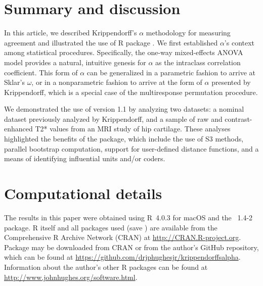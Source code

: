 \section{Summary and discussion}
\label{summary}

In this article, we described Krippendorff's $\alpha$ methodology for measuring agreement and illustrated the use of R package . We first established $\alpha$'s context among statistical procedures. Specifically, the one-way mixed-effects ANOVA model provides a natural, intuitive genesis for $\alpha$ as the intraclass correlation coefficient. This form of $\alpha$ can be generalized in a parametric fashion to arrive at Sklar's $\omega$, or in a nonparametric fashion to arrive at the form of $\alpha$ presented by Krippendorff, which is a special case of the multiresponse permutation procedure.

We demonstrated the use of  version 1.1 by analyzing two datasets: a nominal dataset previously analyzed by Krippendorff, and a sample of raw and contrast-enhanced T2* values from an MRI study of hip cartilage. These analyses highlighted the benefits of the package, which include the use of S3 methods, parallel bootstrap computation, support for user-defined distance functions, and a means of identifying influential units and/or coders.

\section*{Computational details}

The results in this paper were obtained using R~4.0.3 for macOS and the ~1.4-2 package. R itself and all packages used (save ) are available from the Comprehensive R Archive Network (CRAN) at \url{http://CRAN.R-project.org}. Package  may be downloaded from CRAN or from the author's GitHub repository, which can be found at \url{https://github.com/drjphughesjr/krippendorffsalpha}. Information about the author's other R packages can be found at \url{http://www.johnhughes.org/software.html}.

\address{John Hughes\\
  Department of Statistics\\
  The Pennsylvania State University\\
  University Park, PA\\
  USA\\
  }
